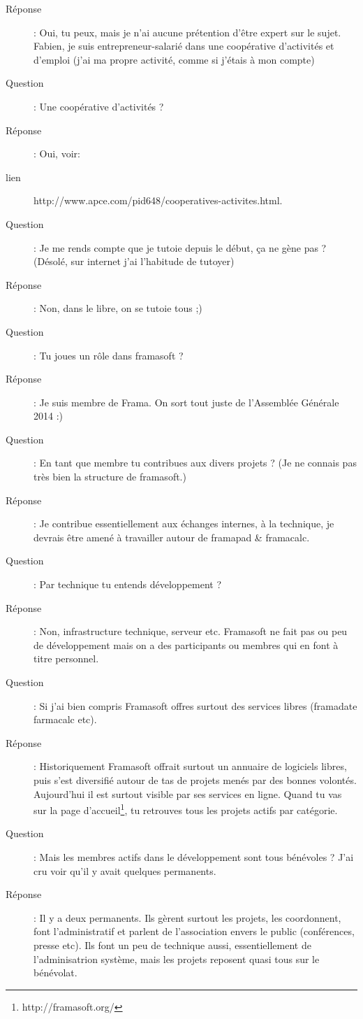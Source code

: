 \documentclass[a4paper,12pt, draft]{report}
\begin{document}
\begin{description}
\item [Réponse]:  Oui, tu peux, mais je n'ai aucune prétention d'être expert sur le sujet.  Fabien, je suis entrepreneur-salarié dans une coopérative d'activités et d'emploi (j'ai ma propre activité, comme si j'étais à mon compte)
\item [Question]:  Une coopérative d'activités ?
\item [Réponse]:  Oui, voir:
\item [lien] http://www.apce.com/pid648/cooperatives-activites.html.
\item [Question]:  Je me rends compte que je tutoie depuis le début, ça ne gène pas ? (Désolé, sur internet j'ai l'habitude de tutoyer)
\item [Réponse]:  Non, dans le libre, on se tutoie tous ;)
\item [Question]:  Tu joues un rôle dans framasoft ?
\item [Réponse]:  Je suis membre de Frama. On sort tout juste de l'Assemblée Générale 2014 :)
\item [Question]:  En tant que membre tu contribues aux divers projets ? (Je ne connais pas très bien la structure de framasoft.)
\item [Réponse]:  Je contribue essentiellement aux échanges internes, à la technique, je devrais être amené à travailler autour de framapad & framacalc.
\item [Question]:  Par technique tu entends développement ?
\item [Réponse]:  Non, infrastructure technique, serveur etc. Framasoft ne fait pas ou peu de développement mais on a des participants ou membres qui en font à titre personnel.
\item [Question]:  Si j'ai bien compris Framasoft offres surtout des services libres (framadate farmacalc etc).
\item [Réponse]:  Historiquement Framasoft offrait surtout un annuaire de logiciels libres, puis s'est diversifié autour de tas de projets menés par des bonnes volontés. Aujourd'hui il est surtout visible par ses services en ligne. Quand tu vas sur la page d'accueil\footnote{http://framasoft.org/}, tu retrouves tous les projets actifs par catégorie.
\item [Question]:  Mais les membres actifs dans le développement sont tous bénévoles ? J'ai cru voir qu'il y avait quelques permanents.
\item [Réponse]:  Il y a deux permanents. Ils gèrent surtout les projets, les coordonnent, font l'administratif et parlent de l'association envers le public (conférences, presse etc). Ils font un peu de technique aussi, essentiellement de l'adminisatrion système, mais les projets reposent quasi tous sur le bénévolat.

\end{description}
\end{document}
